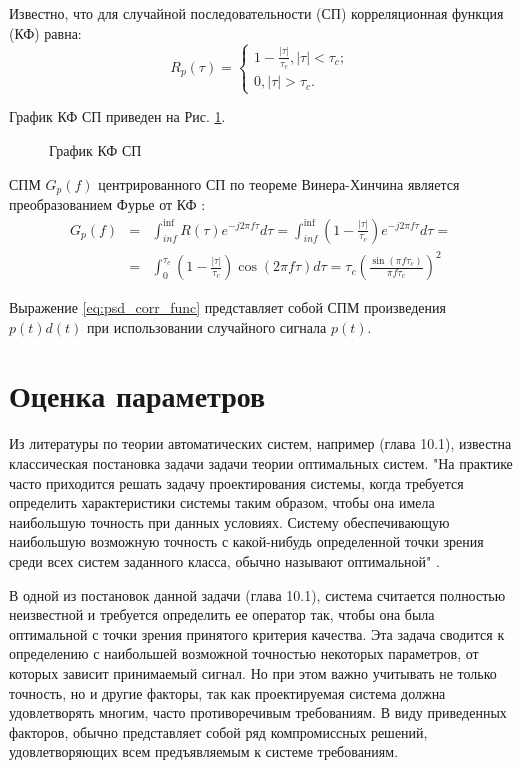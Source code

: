 Известно, что для случайной последовательности (СП) корреляционная функция (КФ) равна:
\begin{equation}
	\label{eq:cdma_ca_corr_func}
	 R_p(\tau) = \begin{cases}
		1 - \frac{|\tau|}{\tau_c}, |\tau| < \tau_c; \\
		0, |\tau| > \tau_c.
		\end{cases}
\end{equation}

График КФ СП приведен на Рис. \ref{pic:cf_code}.
\begin{figure}[h]
	\center{}
	\caption{График КФ СП} 
	\label{pic:cf_code}
\end{figure}

СПМ ${G_p(f)}$ центрированного СП по теореме Винера-Хинчина является преобразованием Фурье
от КФ \cite{borisovBook}:
\begin{eqnarray}
	\label{eq:psd_corr_func}
	G_p(f) & = & \int^{\inf}_{inf} R(\tau)e^{-j2\pi f \tau} d\tau = \int^{\inf}_{inf} \left( 1 - \frac{|\tau|}{\tau_c} \right) e^{-j2\pi f \tau} d\tau = \nonumber \\
		& = & \int^{\tau_c}_{0}\left( 1 - \frac{|\tau|}{\tau_c} \right) \cos{(2\pi f \tau)} d\tau = \tau_c \left( \frac{\sin{(\pi f \tau_c)}}{\pi f \tau_c} \right)^2
\end{eqnarray}

Выражение \ref{eq:psd_corr_func} представляет собой СПМ произведения ${p(t)d(t)}$ при использовании случайного сигнала ${p(t)}$.

\section{Оценка параметров}
Из литературы по теории автоматических систем, например \cite{pugachev} (глава 10.1), известна классическая постановка
задачи задачи теории оптимальных систем. "На практике часто приходится решать задачу проектирования системы, когда
требуется определить характеристики системы таким образом, чтобы она имела наибольшую точность при данных условиях.
Систему обеспечивающую наибольшую возможную точность с какой-нибудь определенной точки зрения среди всех систем
заданного класса, обычно называют оптимальной" \cite{pugachev}.

В одной из постановок данной задачи \cite{pugachev} (глава 10.1), система считается полностью неизвестной
и требуется определить ее оператор так, чтобы она была оптимальной с точки зрения принятого критерия качества. Эта
задача сводится к определению с наибольшей возможной точностью некоторых параметров, от которых зависит принимаемый
сигнал. Но при этом важно учитывать не только точность, но и другие факторы, так как проектируемая система должна
удовлетворять многим, часто противоречивым требованиям. В виду приведенных факторов, обычно представляет собой
ряд компромиссных решений, удовлетворяющих всем предъявляемым к системе требованиям.

